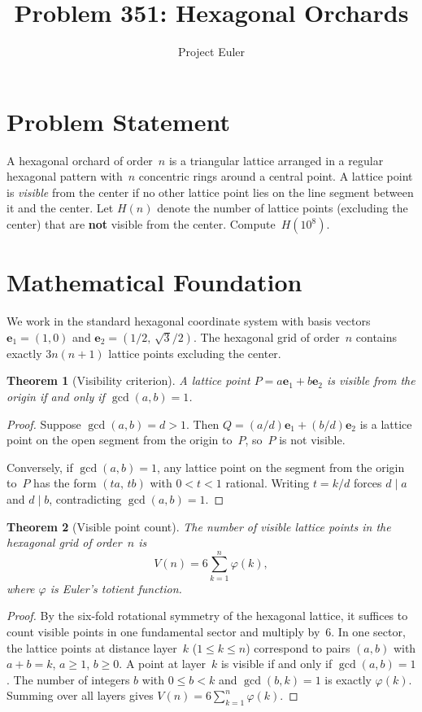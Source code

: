 \documentclass[a4paper,12pt]{article}
\title{Problem 351: Hexagonal Orchards}
\author{Project Euler}
\date{}
\newtheorem{theorem}{Theorem}
\begin{document}
\maketitle

\section{Problem Statement}

A hexagonal orchard of order~$n$ is a triangular lattice arranged in a regular hexagonal pattern with~$n$ concentric rings around a central point. A lattice point is \emph{visible} from the center if no other lattice point lies on the line segment between it and the center. Let $H(n)$ denote the number of lattice points (excluding the center) that are \textbf{not} visible from the center. Compute~$H(10^8)$.

\section{Mathematical Foundation}

We work in the standard hexagonal coordinate system with basis vectors $\mathbf{e}_1 = (1,0)$ and $\mathbf{e}_2 = (1/2,\,\sqrt{3}/2)$. The hexagonal grid of order~$n$ contains exactly $3n(n+1)$ lattice points excluding the center.

\begin{theorem}[Visibility criterion]
A lattice point $P = a\mathbf{e}_1 + b\mathbf{e}_2$ is visible from the origin if and only if $\gcd(a,b) = 1$.
\end{theorem}

\begin{proof}
Suppose $\gcd(a,b) = d > 1$. Then $Q = (a/d)\mathbf{e}_1 + (b/d)\mathbf{e}_2$ is a lattice point on the open segment from the origin to~$P$, so~$P$ is not visible.

Conversely, if $\gcd(a,b) = 1$, any lattice point on the segment from the origin to~$P$ has the form $(ta,\,tb)$ with $0 < t < 1$ rational. Writing $t = k/d$ forces $d \mid a$ and $d \mid b$, contradicting $\gcd(a,b)=1$.
\end{proof}

\begin{theorem}[Visible point count]
The number of visible lattice points in the hexagonal grid of order~$n$ is
\[
V(n) = 6\sum_{k=1}^{n} \varphi(k),
\]
where $\varphi$ is Euler's totient function.
\end{theorem}

\begin{proof}
By the six-fold rotational symmetry of the hexagonal lattice, it suffices to count visible points in one fundamental sector and multiply by~6. In one sector, the lattice points at distance layer~$k$ ($1 \le k \le n$) correspond to pairs $(a,b)$ with $a+b = k$, $a \ge 1$, $b \ge 0$. A point at layer~$k$ is visible if and only if $\gcd(a,b) = 1$. The number of integers $b$ with $0 \le b < k$ and $\gcd(b,k) = 1$ is exactly $\varphi(k)$. Summing over all layers gives $V(n) = 6\sum_{k=1}^{n}\varphi(k)$.
\end{proof}
\end{document}
